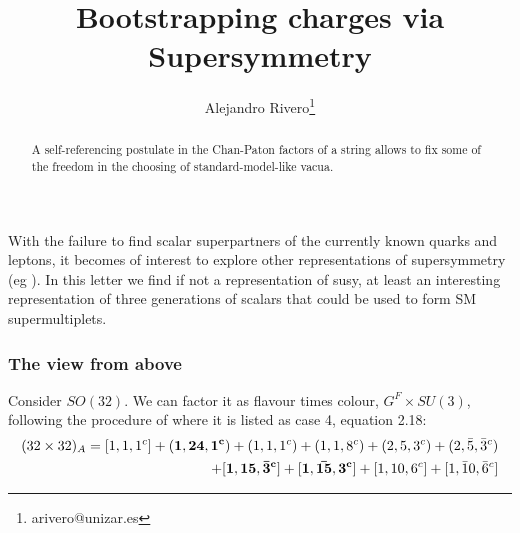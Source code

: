 \documentclass[a4paper]{article}
\title{Bootstrapping charges via Supersymmetry}
\author{Alejandro Rivero\footnote{arivero@unizar.es}}
\begin{document}
\maketitle

\begin{abstract}
A self-referencing postulate in the Chan-Paton
factors of a string allows to fix some of the freedom in the choosing of
standard-model-like vacua.

\hrulefill
\hrulefill
\end{abstract}

With the failure to find scalar superpartners of the currently known
quarks and leptons, it becomes of interest to explore other 
representations of supersymmetry (eg \cite{Jourjine:2012hv,Armori}). 
In this letter we find if not a representation of susy, at least
an interesting representation of three generations of scalars that 
could be used to form SM supermultiplets. 

\subsubsection*{The view from above}
Consider $SO(32)$. We can factor it as flavour times colour, $G^F \times SU(3)$, following the
procedure of  \cite{GellMann:1976pg} where it is listed as case 4, equation
2.18:
\begin{eqnarray*}
(32 \times 32)_A= [1,1,1^c] + {\bf (1,24,1^c) }+ (1,1,1^c) 
        +(1,1,8^c) + (2,5,3^c) + (2,\bar 5, \bar 3^c) \\
      +{\bf [1,15,\bar3^c]} + {\bf [1, \bar {15}, 3^c]} 
      +[1,10,6^c] + [1, \bar 10, \bar 6^c] 
\end{eqnarray*}
\end{document}
